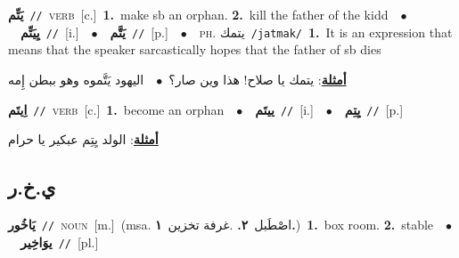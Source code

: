\documentclass[10pt,a4paper,twoside]{article} %
\begin{document}
\begin{multicols}{2}
{{\setlength\topsep{0pt}\textbf{\foreignlanguage{arabic}{يَتِّم}}\ {\color{gray}\texttt{//}\color{black}}\ \textsc{verb}\ [c.]\ \textbf{1.}~make sb an orphan.  \textbf{2.}~kill the father of the kidd\ \ $\bullet$\ \ \setlength\topsep{0pt}\textbf{\foreignlanguage{arabic}{يِيَتِّم}}\ {\color{gray}\texttt{//}\color{black}}\ [i.]\ \ $\bullet$\ \ \setlength\topsep{0pt}\textbf{\foreignlanguage{arabic}{يَتَّم}}\ {\color{gray}\texttt{//}\color{black}}\ [p.]\ \ $\bullet$\ \ \textsc{ph.} \color{gray} \foreignlanguage{arabic}{يتمك}\color{black}\ {\color{gray}\texttt{/{\sffamily jatmak}/}\color{black}}\ \textbf{1.}~It is an expression that means that the speaker sarcastically hopes that the father of sb dies\  \begin{flushright}\color{gray}\foreignlanguage{arabic}{\textbf{\underline{\foreignlanguage{arabic}{أمثلة}}}: يتمك يا صلاح! هذا وين صار؟\ $\bullet$\ \  اليهود يَتَّموه وهو ببطن إِمه}\end{flushright}\color{black}} \vspace{2mm}

{\setlength\topsep{0pt}\textbf{\foreignlanguage{arabic}{اِيتَم}}\ {\color{gray}\texttt{//}\color{black}}\ \textsc{verb}\ [c.]\ \textbf{1.}~become an orphan\ \ $\bullet$\ \ \setlength\topsep{0pt}\textbf{\foreignlanguage{arabic}{ييتَم}}\ {\color{gray}\texttt{//}\color{black}}\ [i.]\ \ $\bullet$\ \ \setlength\topsep{0pt}\textbf{\foreignlanguage{arabic}{يِتِم}}\ {\color{gray}\texttt{//}\color{black}}\ [p.]\  \begin{flushright}\color{gray}\foreignlanguage{arabic}{\textbf{\underline{\foreignlanguage{arabic}{أمثلة}}}: الولد يِتِم عبكير يا حرام}\end{flushright}\color{black}} \vspace{2mm}

\vspace{-3mm}
\subsection*{\color{blue}\foreignlanguage{arabic}{ي.خ.ر}\color{blue}{ (ntws)}} 

{\setlength\topsep{0pt}\textbf{\foreignlanguage{arabic}{يَاخُور}}\ {\color{gray}\texttt{//}\color{black}}\ \textsc{noun}\ [m.]\ \color{gray}(msa. \foreignlanguage{arabic}{اصْطَبل}~\foreignlanguage{arabic}{\textbf{٢.}}  .\foreignlanguage{arabic}{غرفة تخزين}~\foreignlanguage{arabic}{\textbf{١.}})\color{black}\ \textbf{1.}~box room.  \textbf{2.}~stable\ \ $\bullet$\ \ \setlength\topsep{0pt}\textbf{\foreignlanguage{arabic}{يوَاخِير}}\ {\color{gray}\texttt{//}\color{black}}\ [pl.]\ 

}}
\end{multicols}
\end{document}
